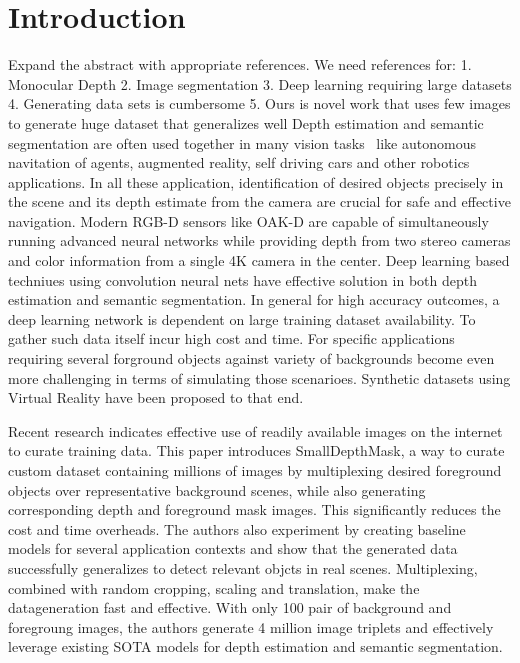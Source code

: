 \documentclass[review]{cvpr}
\begin{document}
\section{Introduction}
Expand the abstract with appropriate references. We need references for:
1. Monocular Depth
2. Image segmentation
3. Deep learning requiring large datasets
4. Generating data sets is cumbersome
5. Ours is novel work that uses few images to generate huge dataset that generalizes well
Depth estimation and semantic segmentation are often used together in many vision tasks~\cite{lin2018joint} like 
autonomous navitation of agents, augmented reality, self driving cars and other robotics applications. In all these application,
identification of desired objects precisely in the scene and its depth estimate from the camera are crucial for safe and effective
navigation. Modern RGB-D sensors like OAK-D are capable of simultaneously running advanced neural networks while providing depth 
from two stereo cameras and color information from a single 4K camera in the center. Deep learning based techniues using convolution
neural nets have effective solution in both depth estimation and semantic segmentation. In general for high accuracy outcomes, a
deep learning network is dependent on large training dataset availability. To gather such data itself incur high cost and time.
For specific applications requiring several forground objects against variety of backgrounds become even more challenging in terms
of simulating those scenarioes. Synthetic datasets using Virtual Reality have been proposed to that end.

Recent research indicates effective use of readily available images on the internet to curate training data.  
This paper introduces SmallDepthMask, 
a way to curate custom dataset containing millions of images by multiplexing desired foreground objects over representative background 
scenes, while also generating corresponding depth and foreground mask images. This significantly reduces the cost and time overheads.
The authors also experiment by creating baseline models for several application contexts and show that the generated data
successfully generalizes to detect relevant objcts in real scenes. Multiplexing, combined with random cropping, scaling 
and translation, make the datageneration fast and effective. With only 100 pair of background and foregroung images, the authors
generate 4 million image triplets and effectively leverage existing SOTA models for depth estimation and semantic segmentation.
\end{document}
